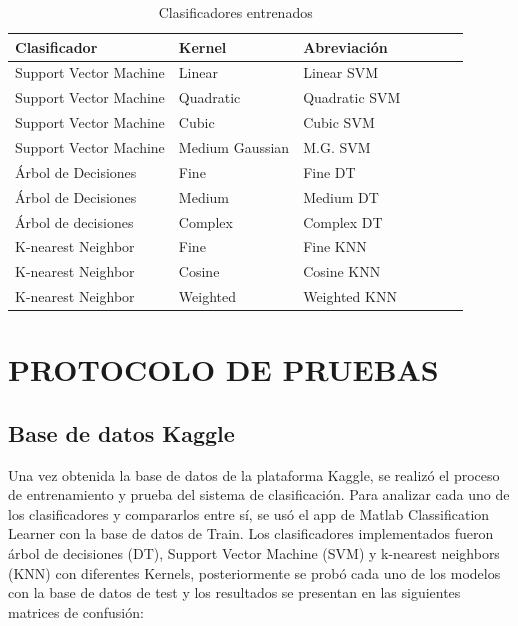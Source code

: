 \documentclass[11pt]{report}
\begin{document}
\begin{table}[H]
\begin{center}
  \begin{tabular}{|l|l|l|l|l|l|l|}
    \hline
 \textbf{Clasificador} & \textbf{Kernel} & \textbf{Abreviación}\\
    \hline
    Support Vector Machine & Linear & Linear SVM \\
    \hline
    Support Vector Machine & Quadratic & Quadratic SVM \\
    \hline
    Support Vector Machine & Cubic & Cubic SVM \\
    \hline
     Support Vector Machine & Medium Gaussian & M.G. SVM \\
    \hline
    Árbol de Decisiones & Fine & Fine DT \\
    \hline
    Árbol de Decisiones & Medium & Medium DT \\
    \hline
    Árbol de decisiones & Complex & Complex DT \\
    \hline
     K-nearest Neighbor & Fine & Fine KNN \\
    \hline
    K-nearest Neighbor & Cosine & Cosine KNN \\
    \hline
    K-nearest Neighbor & Weighted & Weighted KNN \\
    \hline
  \end{tabular}
\label{Efectos de PCA}
\caption{Clasificadores entrenados}
\end{center}
\end{table}


\chapter{PROTOCOLO DE PRUEBAS}

\section{Base de datos Kaggle}

\par
\medskip
\noindent
Una vez obtenida la base de datos de la plataforma Kaggle, se realizó el proceso de entrenamiento y prueba del sistema de clasificación.
Para analizar cada uno de los clasificadores y compararlos entre sí, se usó el app de Matlab Classification Learner con la base de datos de Train. Los clasificadores implementados fueron árbol de decisiones (DT), Support Vector Machine (SVM) y k-nearest neighbors (KNN) con diferentes Kernels, posteriormente se probó cada uno de los modelos con la base de datos de test y los resultados se presentan en las siguientes matrices de confusión:
\end{document}
